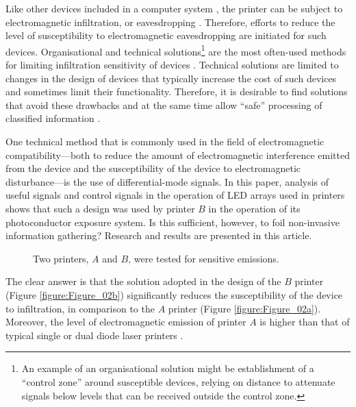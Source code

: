 \documentclass[letterpaper,journal]{ieeetran}
\begin{document}
Like other devices included in a computer system \cite{Kuhn2002,Kubiak2016a},
the printer can be subject to electromagnetic infiltration, or eavesdropping
\cite{Ketenci2015a,Kubiak2016b}. Therefore, efforts to reduce the level of
susceptibility to electromagnetic eavesdropping are initiated for such
devices. Organisational and technical solutions\footnote{An example of an
organisational solution might be establishment of a ``control zone'' around
susceptible devices, relying on distance to attenuate signals below levels
that can be received outside the control zone.} are the most often-used
methods for limiting infiltration sensitivity of devices \cite{Kubiak2006a}.
Technical solutions are limited to changes in the
design of devices that typically increase the cost of such devices and
sometimes limit their functionality. Therefore, it is desirable to find
solutions that avoid these drawbacks and at the same time allow ``safe''
processing of classified information \cite{Wasfy2011a,Goel2012a}.

One technical method that is commonly used in the field of electromagnetic
compatibility---both to reduce the amount of electromagnetic interference
emitted from the device and the susceptibility of the device to
electromagnetic disturbance---is the use of differential-mode signals.
In this paper, analysis of useful signals and control signals
\cite{Kubiak2017d} in the operation of LED arrays
used in printers shows that such a design was used by printer $B$ in the
operation of its photoconductor exposure system. Is this sufficient, however,
to foil non-invasive information gathering? Research and results are
presented in this article.

\begin{figure*}[ht]
    \centering
    \hfil
    \caption{Two printers, $A$ and $B$, were tested for sensitive emissions.}
    \label{figure:Figure_02}
\end{figure*}

The clear answer is that the solution adopted in the design of the $B$
printer (Figure \ref{figure:Figure_02b}) significantly reduces the
susceptibility of the device to infiltration, in comparison to the $A$
printer (Figure \ref{figure:Figure_02a}). Moreover, the level of
electromagnetic emission of printer $A$ is higher than that of
typical single or dual diode laser printers \cite{Kubiak2014b}.
\end{document}
